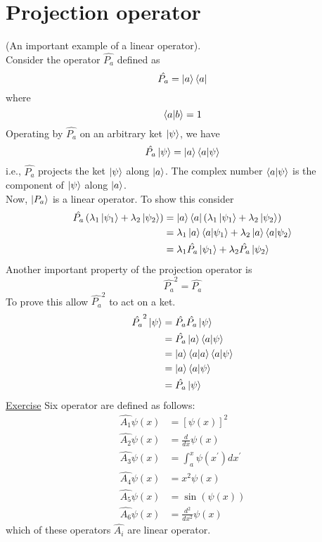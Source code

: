 \section{Projection operator}
(An important example of a linear operator).\\
Consider the operator $\hat{P_a}$ defined as
\begin{equation}\label{eqn3.18}
\hat{P_a} = \ket{a} \bra{a}
\end{equation}
where
\begin{equation}\label{eqn3.19}
\braket{a}{b} = 1
\end{equation}
Operating by $\hat{P_a}$ on an arbitrary ket $\ket{\psi}$, we have
\begin{equation}\label{eqn3.20}
\hat{P_a}\ket{\psi} = \ket{a}\bra{a}\ket{\psi}
\end{equation}
i.e., $\hat{P_a}$ projects the ket $\ket{\psi}$ along $\ket{a}$. The complex number $\braket{a}{\psi}$ is the component of $\ket{\psi}$ along $\ket{a}$.\\
Now, $\ket{P_a}$ is a linear operator. To show this consider
\begin{align}\label{eqn3.21-3.23}
	\hat{P_a} \left(\lambda_1\ket{\psi_1} + \lambda_2\ket{\psi_2
	}\right) &= \ket{a}\bra{a} \left(\lambda_1\ket{\psi_1} + \lambda_2\ket{\psi_2}\right)\\
	&= \lambda_1\ket{a}\bra{a} \ket{\psi_1} + \lambda_2\ket{a}\bra{a} \ket{\psi_2}\\
	&= \lambda_1\hat{P_a} \ket{\psi_1} + \lambda_2\hat{P_a} \ket{\psi_2}
\end{align}
Another important property of the projection operator is
\begin{equation}\label{eqn3.24}
\hat{P_a}^2 = \hat{P_a}
\end{equation}
To prove this allow $\hat{P_a}^2$ to act on a ket.
\begin{align}\label{eqn3.25-3.29}
	\hat{P_a}^2 \ket{\psi} &= \hat{P_a} \hat{P_a} \ket{\psi} \\
	&= \hat{P_a} \ket{a}\braket{a}{\psi} \\
	&= \ket{a} \braket{a}{a}\braket{a}{\psi} \\
	&= \ket{a} \braket{a}{\psi} \\
	&= \hat{P_a}\ket{\psi}
\end{align}
\underline{Exercise} Six operator are defined as follows:
\begin{align}\label{eqn3.30-3.35}
	\hat{A_1} \psi(x) &= [\psi(x)]^2 \\
	\hat{A_2} \psi(x) &= \frac{d}{dx}\psi(x) \\
	\hat{A_3} \psi(x) &= \int_{a}^{x}\psi(x^\prime) dx^\prime\\
	\hat{A_4} \psi(x) &=  x^2 \psi(x) \\
	\hat{A_5} \psi(x) &= \sin(\psi(x)) \\
	\hat{A_6} \psi(x) &= \frac{d^2}{dx^2}\psi(x)
\end{align}
which of these operators $\hat{A_i}$ are linear operator.



